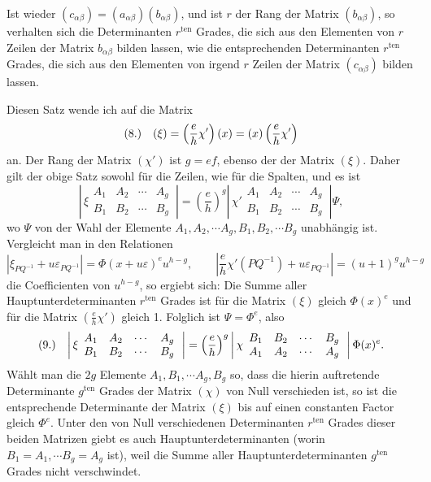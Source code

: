 \documentclass[11pt]{article}
\makeatletter
\newcommand{\frobtag}[2]{\[\begin{array}{@{}r@{\quad}l@{}}\textup{(#1)} & \displaystyle #2\end{array}\]}
\newcommand{\frobtagc}[2]{\[\begin{array}{@{}r@{\quad}c@{}}\textup{(#1)} & \displaystyle #2\end{array}\]}
\makeatother
\begin{document}
Ist wieder $(c_{\alpha\beta})=(a_{\alpha\beta})(b_{\alpha\beta})$, und ist $r$ der Rang der Matrix $(b_{\alpha\beta})$, so verhalten sich die Determinanten $r^{\mathrm{ten}}$ Grades, die sich aus den Elementen von $r$ Zeilen der Matrix $b_{\alpha\beta}$ bilden lassen, wie die entsprechenden Determinanten $r^{\mathrm{ten}}$ Grades, die sich aus den Elementen von irgend $r$ Zeilen der Matrix $(c_{\alpha\beta})$ bilden lassen.

Diesen Satz wende ich auf die Matrix
\frobtagc{8.}{(\xi)=\left(\frac{e}{h}\chi'\right)(x)=(x)\left(\frac{e}{h}\chi'\right)}
an. Der Rang der Matrix $(\chi')$ ist $g=ef$, ebenso der der Matrix $(\xi)$. Daher gilt der obige Satz sowohl für die Zeilen, wie für die Spalten, und es ist
\[
\left|\,\xi\begin{array}{cccc}
A_1&A_2&\cdots&A_g\\
B_1&B_2&\cdots&B_g
\end{array}\,\right|
=\left(\frac{e}{h}\right)^g
\left|\,\chi'\begin{array}{cccc}
A_1&A_2&\cdots&A_g\\
B_1&B_2&\cdots&B_g
\end{array}\,\right|\Psi,
\]
wo $\Psi$ von der Wahl der Elemente $A_1,A_2,\cdots A_g,B_1,B_2,\cdots B_g$ unabhängig ist. Vergleicht man in den Relationen
\[
\left|\xi_{PQ^{-1}}+u\varepsilon_{PQ^{-1}}\right|=\Phi(x+u\varepsilon)^e u^{h-g},\qquad
\left|\frac{e}{h}\chi'(PQ^{-1})+u\varepsilon_{PQ^{-1}}\right|=(u+1)^g u^{h-g}
\]
die Coefficienten von $u^{h-g}$, so ergiebt sich: Die Summe aller Hauptunterdeterminanten $r^{\mathrm{ten}}$ Grades ist für die Matrix $(\xi)$ gleich $\Phi(x)^e$ und für die Matrix $\left(\frac{e}{h}\chi'\right)$ gleich 1. Folglich ist $\Psi=\Phi^e$, also
\frobtag{9.}{\left|\,\xi\begin{array}{cccc}
A_1&A_2&\cdots&A_g\\
B_1&B_2&\cdots&B_g
\end{array}\,\right|
=\left(\frac{e}{h}\right)^g
\left|\,\chi\begin{array}{cccc}
B_1&B_2&\cdots&B_g\\
A_1&A_2&\cdots&A_g
\end{array}\,\right|\Phi(x)^e.}
Wählt man die $2g$ Elemente $A_1,B_1,\cdots A_g,B_g$ so, dass die hierin auftretende Determinante $g^{\mathrm{ten}}$ Grades der Matrix $(\chi)$ von Null verschieden ist, so ist die entsprechende Determinante der Matrix $(\xi)$ bis auf einen constanten Factor gleich $\Phi^e$. Unter den von Null verschiedenen Determinanten $r^{\mathrm{ten}}$ Grades dieser beiden Matrizen giebt es auch Hauptunterdeterminanten (worin $B_1=A_1,\cdots B_g=A_g$ ist), weil die Summe aller Hauptunterdeterminanten $g^{\mathrm{ten}}$ Grades nicht verschwindet.
\end{document}
